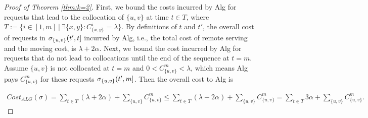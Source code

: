 \documentclass[manuscript,screen=true, review, anonymous]{acmart}
\DeclarePairedDelimiter\set{\{}{\}}
\begin{document}
\begin{proof}[Proof of Theorem \ref{thm:k=2}]
	First,
	we bound the costs incurred by Alg for requests that
	lead to the collocation of $\{u,v\}$ at time $t \in T$, where
	$T := \{ i \in [1,m] ~\vert~ \exists \{x,y\}: C^{i}_{\{x,y\}} = \lambda \}$.
	By definitions of $t$ and $t'$,
	the overall cost of requests in $\sigma_{\set{u,v}}(t',t]$ incurred by Alg,
	i.e., the total cost of remote serving
	and the moving cost, is
	$\lambda + 2\alpha$.	
	Next,
	we bound the cost incurred by Alg
	for requests that do not lead to collocations until the  end of the sequence at $t=m$.
	Assume $\{u,v\}$ is not collocated at $t=m$
	and $0 < C^{m}_{ \{u,v\} } < \lambda $,
	which means Alg pays $C^{m}_{ \{u,v\} }$
	for these requests $\sigma_{\set{u,v}}(t',m]$.
    Then the overall cost to Alg is
	
	\begin{align*}	%
	\mathit{Cost}_{\mathit{ALG}} (\sigma)
	=
	\sum_{ t \in T}(\lambda + 2\alpha) +
	\sum_{\{u,v\}} C^{m}_{\{u,v\}}	
	\leq
	\sum_{ t \in T}(\lambda + 2\alpha) +
	\sum_{\{u,v\}} C^{m}_{\{u,v\}}	
	=
	\sum_{ t \in T} 3\alpha +
	\sum_{\{u,v\}} C^{m}_{\{u,v\}}
	.
	\end{align*}
	

\end{proof}
\end{document}
